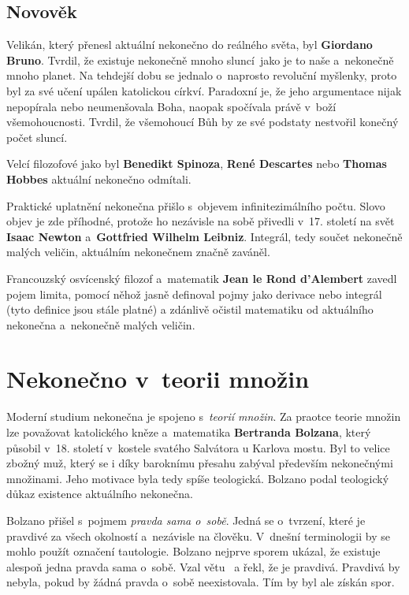 \documentclass[czech]{article}
\begin{document}
\subsection*{Novověk}

Velikán, který přenesl aktuální nekonečno do reálného světa, byl  \textbf{Giordano Bruno}.
Tvrdil, že existuje nekonečně mnoho sluncí~jako je to naše a~nekonečně mnoho planet. Na tehdejší dobu se jednalo o~naprosto revoluční myšlenky, proto byl za své učení upálen katolickou církví. Paradoxní je, že jeho argumentace nijak nepopírala nebo neumenšovala Boha, naopak spočívala právě v~boží všemohoucnosti. Tvrdil, že všemohoucí Bůh by ze své podstaty nestvořil konečný počet sluncí. 

Velcí filozofové jako byl \textbf{Benedikt Spinoza}, \textbf{René Descartes} nebo \textbf{Thomas Hobbes} aktuální nekonečno odmítali. \cite{vopenka_infinitni_mateatika}

Praktické uplatnění nekonečna přišlo s~objevem infinitezimálního počtu. Slovo objev je zde příhodné, protože ho nezávisle na sobě přivedli v~17. století na svět \textbf{Isaac Newton} a~\textbf{Gottfried Wilhelm Leibniz}.
Integrál, tedy součet nekonečně malých veličin, aktuálním nekonečnem značně zaváněl.

Francouzský osvícenský filozof a~matematik \textbf{Jean le Rond d’Alembert} zavedl pojem limita, pomocí něhož jasně definoval pojmy jako derivace nebo integrál (tyto definice jsou stále platné) a zdánlivě očistil matematiku od aktuálního nekonečna a~nekonečně malých veličin.


\section*{Nekonečno v~teorii množin}
Moderní studium nekonečna je spojeno s~\textit{teorií množin}. Za praotce teorie množin lze považovat katolického kněze a~matematika \textbf{Bertranda Bolzana}, který působil v~18. století v~kostele svatého Salvátora u Karlova mostu.\cite{salvator} Byl to velice zbožný muž, který se i díky baroknímu přesahu zabýval především nekonečnými množinami. Jeho motivace byla tedy spíše teologická. 
Bolzano podal teologický důkaz existence aktuálního nekonečna.

Bolzano přišel s~pojmem \textit{pravda sama o~sobě}. Jedná se o~tvrzení, které je pravdivé za všech okolností a~nezávisle na člověku. V~dnešní terminologii by se mohlo použít označení tautologie. 
Bolzano nejprve sporem ukázal, že existuje alespoň jedna pravda sama o~sobě. Vzal větu ~a řekl, že je pravdivá. Pravdivá by nebyla, pokud by žádná pravda o~sobě neexistovala. Tím by byl ale získán spor. 
\end{document}
